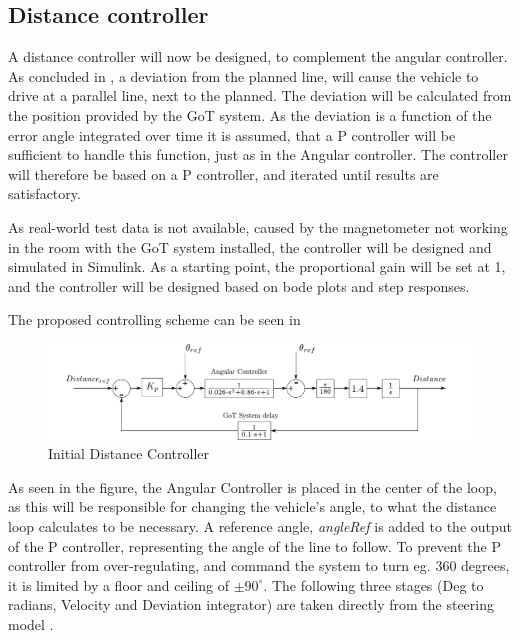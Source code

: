 \subsection{Distance controller}\label{ssec:distanceController}
A distance controller will now be designed, to complement the angular controller.
As concluded in , a deviation from the planned line, will cause the vehicle to drive at a parallel line, next to the planned. The deviation will be calculated from the position provided by the GoT system. As the deviation is a function of the error angle integrated over time it is assumed, that a P controller will be sufficient to handle this function, just as in the Angular controller. The controller will therefore be based on a P controller, and iterated until results are satisfactory. 

As real-world test data is not available, caused by the magnetometer not working in the room with the GoT system installed, the controller will be designed and simulated in Simulink. As a starting point, the proportional gain will be set at 1, and the controller will be designed based on bode plots and step responses.

The proposed controlling scheme can be seen in 

\begin{figure}[H]
\centering
\includegraphics[width=\textwidth]{figures/steeringFullModel.pdf} 
\caption{Initial Distance Controller}
\label{SteeringSimulink}
\end{figure}
As seen in the figure, the Angular Controller is placed in the center of the loop, as this will be responsible for changing the vehicle's angle, to what the distance loop calculates to be necessary. A reference angle, \emph{angleRef} is added to the output of the P controller, representing the angle of the line to follow. To prevent the P controller from over-regulating, and command the system to turn eg. 360 degrees, it is limited by a floor and ceiling of $\pm 90^\circ$. The following three stages (Deg to radians, Velocity and Deviation integrator) are taken directly from the steering model .

